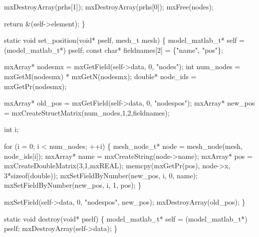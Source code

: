     mxDestroyArray(prhs[1]);
    mxDestroyArray(prhs[0]);
    mxFree(nodes);

    return &(self->element);
\}

\nwendcode{}\nwdocspar

\nwenddocs{}\plusendmoddef
static void set_position(void* pself, mesh_t mesh)
\{
    model_matlab_t* self = (model_matlab_t*) pself;
    const char* fieldnames[2] = \{"name", "pos"\};

    mxArray* nodesmx   = mxGetField(self->data, 0, "nodes");
    int      num_nodes = mxGetM(nodesmx) * mxGetN(nodesmx);
    double*  node_ids  = mxGetPr(nodesmx);

    mxArray* old_pos = mxGetField(self->data, 0, "nodespos");
    mxArray* new_pos = mxCreateStructMatrix(num_nodes,1,2,fieldnames);

    int i;

    for (i = 0; i < num_nodes; ++i) \{
        mesh_node_t* node = mesh_node(mesh, node_ids[i]);
        mxArray* name = mxCreateString(node->name);
        mxArray* pos  = mxCreateDoubleMatrix(3,1,mxREAL);
        memcpy(mxGetPr(pos), node->x, 3*sizeof(double));
        mxSetFieldByNumber(new_pos, i, 0, name);
        mxSetFieldByNumber(new_pos, i, 1, pos);
    \}

    mxSetField(self->data, 0, "nodespos", new_pos);
    mxDestroyArray(old_pos);
\}

\nwendcode{}\nwdocspar

\nwenddocs{}\plusendmoddef
static void destroy(void* pself)
\{
    model_matlab_t* self = (model_matlab_t*) pself;
    mxDestroyArray(self->data);
\}

